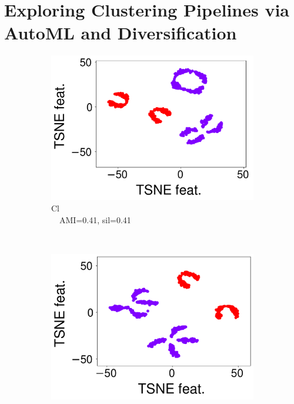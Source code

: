 
\chapter{Exploring Clustering Pipelines via AutoML and Diversification}
\label{data-centric-chap:unsupervised}

\begin{figure}[t]
    \begin{subfigure}[t]{0.23\columnwidth}
        \centering
        \includegraphics[scale=.15]{chapters/data-centric/unsupervised/img/cl.pdf}
        \caption{Cl\\$\quad$AMI=0.41, sil=0.41}
        \label{clustering-fig:ca3}
    \end{subfigure}
    ~
    \begin{subfigure}[t]{0.23\columnwidth}
        \centering
        \includegraphics[scale=.15]{chapters/data-centric/unsupervised/img/ft_cl.pdf}

\end{subfigure}
\end{figure}
